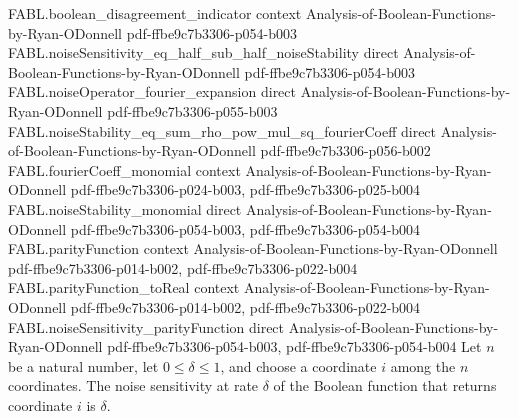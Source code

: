 \begin{theorem}
\proofstep
  {FABL.boolean_disagreement_indicator}
  {context}
  {Analysis-of-Boolean-Functions-by-Ryan-ODonnell}
  {pdf-ffbe9c7b3306-p054-b003}
\proofstep
  {FABL.noiseSensitivity_eq_half_sub_half_noiseStability}
  {direct}
  {Analysis-of-Boolean-Functions-by-Ryan-ODonnell}
  {pdf-ffbe9c7b3306-p054-b003}
\proofstep
  {FABL.noiseOperator_fourier_expansion}
  {direct}
  {Analysis-of-Boolean-Functions-by-Ryan-ODonnell}
  {pdf-ffbe9c7b3306-p055-b003}
\proofstep
  {FABL.noiseStability_eq_sum_rho_pow_mul_sq_fourierCoeff}
  {direct}
  {Analysis-of-Boolean-Functions-by-Ryan-ODonnell}
  {pdf-ffbe9c7b3306-p056-b002}
\proofstep
  {FABL.fourierCoeff_monomial}
  {context}
  {Analysis-of-Boolean-Functions-by-Ryan-ODonnell}
  {pdf-ffbe9c7b3306-p024-b003,
    pdf-ffbe9c7b3306-p025-b004}
\proofstep
  {FABL.noiseStability_monomial}
  {direct}
  {Analysis-of-Boolean-Functions-by-Ryan-ODonnell}
  {pdf-ffbe9c7b3306-p054-b003,
    pdf-ffbe9c7b3306-p054-b004}
\proofstep
  {FABL.parityFunction}
  {context}
  {Analysis-of-Boolean-Functions-by-Ryan-ODonnell}
  {pdf-ffbe9c7b3306-p014-b002,
    pdf-ffbe9c7b3306-p022-b004}
\proofstep
  {FABL.parityFunction_toReal}
  {context}
  {Analysis-of-Boolean-Functions-by-Ryan-ODonnell}
  {pdf-ffbe9c7b3306-p014-b002,
    pdf-ffbe9c7b3306-p022-b004}
\proofstep
  {FABL.noiseSensitivity_parityFunction}
  {direct}
  {Analysis-of-Boolean-Functions-by-Ryan-ODonnell}
  {pdf-ffbe9c7b3306-p054-b003,
    pdf-ffbe9c7b3306-p054-b004}
Let $n$ be a natural number, let $0\le\delta\le1$, and choose a coordinate $i$ among the
$n$ coordinates. The noise sensitivity at rate $\delta$ of the Boolean function that
returns coordinate $i$ is $\delta$.
\end{theorem}
